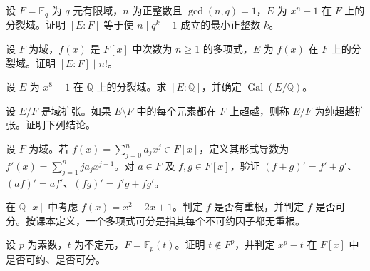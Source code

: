 \noindent\begin{minipage}{\textwidth}
设 $F=\mathbb F_q$ 为 $q$ 元有限域，$n$ 为正整数且 $\gcd(n,q)=1$，$E$ 为 $x^n-1$ 在 $F$ 上的分裂域。证明 $[E:F]$ 等于使 $n\mid q^k-1$ 成立的最小正整数 $k$。
\end{minipage}\par\vfill
\newpage
\noindent\begin{minipage}{\textwidth}
设 $F$ 为域，$f(x)$ 是 $F[x]$ 中次数为 $n\ge 1$ 的多项式，$E$ 为 $f(x)$ 在 $F$ 上的分裂域。证明 $[E:F]\mid n!$。
\end{minipage}\par\vfill
\noindent\begin{minipage}{\textwidth}
设 $E$ 为 $x^8-1$ 在 $\mathbb Q$ 上的分裂域。求 $[E:\mathbb Q]$，并确定 $\operatorname{Gal}(E/\mathbb Q)$。
\end{minipage}\par\vfill
\noindent\begin{minipage}{\textwidth}
设 $E/F$ 是域扩张。如果 $E\setminus F$ 中的每个元素都在 $F$ 上超越，则称 $E/F$ 为纯超越扩张。证明下列结论。
\end{minipage}\par\vfill
\newpage
\noindent\begin{minipage}{\textwidth}
设 $F$ 为域。若 $f(x)=\sum_{j=0}^n a_jx^j\in F[x]$，定义其形式导数为 $f'(x)=\sum_{j=1}^n ja_jx^{j-1}$。对 $a\in F$ 及 $f,g\in F[x]$，验证 $(f+g)'=f'+g'$、$(af)'=af'$、$(fg)'=f'g+fg'$。
\end{minipage}\par\vfill
\noindent\begin{minipage}{\textwidth}
在 $\mathbb Q[x]$ 中考虑 $f(x)=x^2-2x+1$。判定 $f$ 是否有重根，并判定 $f$ 是否可分。按课本定义，一个多项式可分是指其每个不可约因子都无重根。
\end{minipage}\par\vfill
\noindent\begin{minipage}{\textwidth}
设 $p$ 为素数，$t$ 为不定元，$F=\mathbb F_p(t)$。证明 $t\notin F^p$，并判定 $x^p-t$ 在 $F[x]$ 中是否可约、是否可分。
\end{minipage}\par\vfill
\newpage
